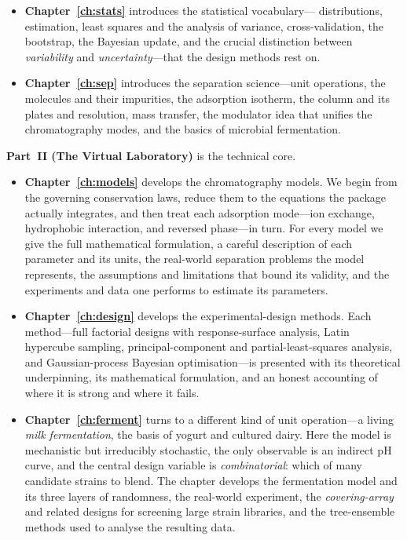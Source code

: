 \begin{itemize}
  \item \textbf{Chapter~\ref{ch:stats}} introduces the statistical vocabulary---
  distributions, estimation, least squares and the analysis of variance,
  cross-validation, the bootstrap, the Bayesian update, and the crucial
  distinction between \emph{variability} and \emph{uncertainty}---that the design
  methods rest on.

  \item \textbf{Chapter~\ref{ch:sep}} introduces the separation science---unit
  operations, the molecules and their impurities, the adsorption isotherm, the
  column and its plates and resolution, mass transfer, the modulator idea that
  unifies the chromatography modes, and the basics of microbial fermentation.
\end{itemize}

\textbf{Part~II (The Virtual Laboratory)} is the technical core.

\begin{itemize}
  \item \textbf{Chapter~\ref{ch:models}} develops the chromatography models. We
  begin from the governing conservation laws, reduce them to the equations the
  package actually integrates, and then treat each adsorption mode---ion
  exchange, hydrophobic interaction, and reversed phase---in turn. For every
  model we give the full mathematical formulation, a careful description of each
  parameter and its units, the real-world separation problems the model
  represents, the assumptions and limitations that bound its validity, and the
  experiments and data one performs to estimate its parameters.

  \item \textbf{Chapter~\ref{ch:design}} develops the experimental-design
  methods. Each method---full factorial designs with response-surface analysis,
  Latin hypercube sampling, principal-component and partial-least-squares
  analysis, and Gaussian-process Bayesian optimisation---is presented with its
  theoretical underpinning, its mathematical formulation, and an honest
  accounting of where it is strong and where it fails.

  \item \textbf{Chapter~\ref{ch:ferment}} turns to a different kind of unit
  operation---a living \emph{milk fermentation}, the basis of yogurt and cultured
  dairy. Here the model is mechanistic but irreducibly stochastic, the only
  observable is an indirect pH curve, and the central design variable is
  \emph{combinatorial}: which of many candidate strains to blend. The chapter
  develops the fermentation model and its three layers of randomness, the
  real-world experiment, the \emph{covering-array} and related designs for
  screening large strain libraries, and the tree-ensemble methods used to analyse
  the resulting data.
\end{itemize}

